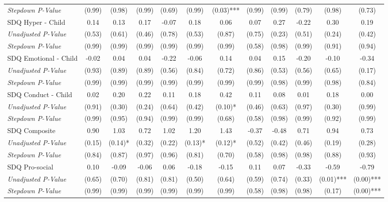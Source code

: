 \begin{tabular}{l c c c c c c c c c c c}
\quad \textit{Stepdown P-Value} & (0.99) & (0.98) & (0.99) & (0.69) & (0.99) & (0.03)*** & (0.99) & (0.99) & (0.79) & (0.98) & (0.73) \\
SDQ Hyper - Child & 0.14 & 0.13 & 0.17 & -0.07 & 0.18 & 0.06 & 0.07 & 0.27 & -0.22 & 0.30 & 0.19 \\
\quad \textit{Unadjusted P-Value} & (0.53) & (0.61) & (0.46) & (0.78) & (0.53) & (0.87) & (0.75) & (0.23) & (0.51) & (0.24) & (0.42) \\
\quad \textit{Stepdown P-Value} & (0.99) & (0.99) & (0.99) & (0.99) & (0.99) & (0.99) & (0.58) & (0.98) & (0.99) & (0.91) & (0.94) \\
SDQ Emotional - Child & -0.02 & 0.04 & 0.04 & -0.22 & -0.06 & 0.14 & 0.04 & 0.15 & -0.20 & -0.10 & -0.34 \\
\quad \textit{Unadjusted P-Value} & (0.93) & (0.89) & (0.89) & (0.56) & (0.84) & (0.72) & (0.86) & (0.53) & (0.56) & (0.65) & (0.17) \\
\quad \textit{Stepdown P-Value} & (0.99) & (0.99) & (0.99) & (0.99) & (0.99) & (0.99) & (0.99) & (0.98) & (0.99) & (0.98) & (0.84) \\
SDQ Conduct - Child & 0.02 & 0.20 & 0.22 & 0.11 & 0.18 & 0.42 & 0.11 & 0.08 & 0.01 & 0.18 & 0.00 \\
\quad \textit{Unadjusted P-Value} & (0.91) & (0.30) & (0.24) & (0.64) & (0.42) & (0.10)* & (0.46) & (0.63) & (0.97) & (0.30) & (0.99) \\
\quad \textit{Stepdown P-Value} & (0.99) & (0.95) & (0.94) & (0.99) & (0.99) & (0.68) & (0.58) & (0.98) & (0.99) & (0.92) & (0.99) \\
SDQ Composite & 0.90 & 1.03 & 0.72 & 1.02 & 1.20 & 1.43 & -0.37 & -0.48 & 0.71 & 0.94 & 0.73 \\
\quad \textit{Unadjusted P-Value} & (0.15) & (0.14)* & (0.32) & (0.22) & (0.13)* & (0.12)* & (0.52) & (0.42) & (0.46) & (0.19) & (0.28) \\
\quad \textit{Stepdown P-Value} & (0.84) & (0.87) & (0.97) & (0.96) & (0.81) & (0.70) & (0.58) & (0.98) & (0.98) & (0.88) & (0.93) \\
SDQ Pro-social & 0.10 & -0.09 & -0.06 & 0.06 & -0.18 & -0.15 & 0.11 & 0.07 & -0.33 & -0.59 & -0.79 \\
\quad \textit{Unadjusted P-Value} & (0.65) & (0.70) & (0.81) & (0.81) & (0.50) & (0.64) & (0.59) & (0.74) & (0.33) & (0.01)*** & (0.00)*** \\
\quad \textit{Stepdown P-Value} & (0.99) & (0.99) & (0.99) & (0.99) & (0.99) & (0.99) & (0.58) & (0.98) & (0.98) & (0.17) & (0.00)*** \\

\end{tabular}
